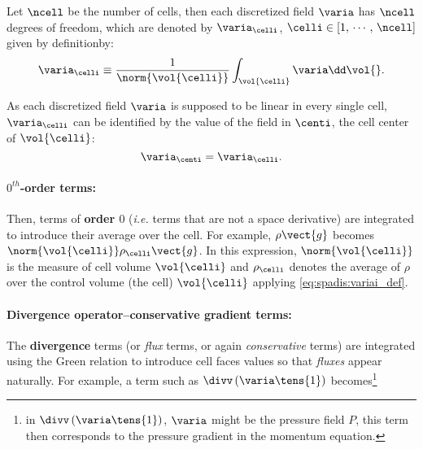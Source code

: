 Let $\ncell$ be the number of cells, then each discretized field $\varia$ has $\ncell$ degrees of freedom,
which are denoted by $\varia_\celli$, $\celli \in \left[ 1 , \, \cdots , \, \ncell \right]$ given by definitionby:
\begin{equation}\label{eq:spadis:variai_def}
\varia_\celli \equiv \dfrac{1}{\norm{\vol{\celli}}}\int_{\vol{\celli}} \varia \dd \vol{}.
\end{equation}

As each discretized field $\varia$ is supposed to be linear in every single cell, $\varia_\celli$ can be identified
by the value of the field in $\centi$, the cell center of $\vol{\celli}$:
\begin{equation}\label{eq:spadis:variai_id}
\varia_\centi = \varia_\celli.
\end{equation}

\paragraph{$0^{th}$-order terms:}
Then, terms of \textbf{order $0$} (\emph{i.e.} terms that are not a space
derivative) are integrated to introduce their average over the cell. For
example, $\rho \vect{g}$ becomes $\norm{\vol{\celli}} \rho_{\celli} \vect{g}$. 
In this expression, $\norm{\vol{\celli}}$ is the measure of cell volume $\vol{\celli}$ and 
$\rho_{\celli}$ denotes the average of $\rho $ over the control volume
(the cell) $\vol{\celli}$ applying \eqref{eq:spadis:variai_def}. 

\paragraph{Divergence operator--conservative gradient terms:}
The \textbf{divergence} terms (or \emph{flux} terms, or again \emph{conservative}
terms) are integrated using the Green relation to introduce cell faces
values so that \emph{fluxes} appear naturally. For example, a term such as 
$\divv \left( \varia \tens{1}\right)$ becomes\footnote{%
in $\divv \left( \varia \tens{1}\right)$, $\varia$ might be the pressure field $P$, this term then corresponds to the pressure gradient
in the momentum equation.
}%



